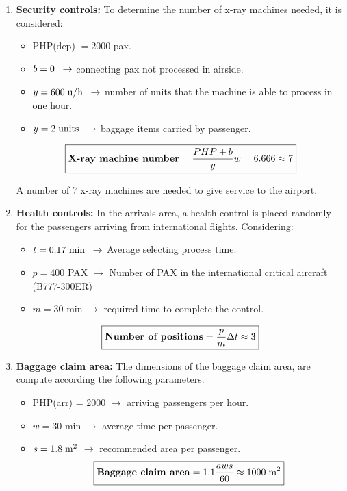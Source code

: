 \begin{enumerate}
\item \textbf{Security controls:} To determine the number of x-ray machines needed, it is considered:
\begin{itemize}
\item PHP(dep) $= 2000$ pax.
\item $b = 0 \hspace{2mm} \rightarrow$ connecting pax not processed in airside.
\item $y = 600\hspace{1mm} \text{u/h} \hspace{2mm} \rightarrow$ number of units that the machine is able to process in one hour.
\item $y = 2\hspace{1mm} \text{units} \hspace{2mm} \rightarrow$ baggage items carried by passenger.
\end{itemize}

\begin{align*}
\boxed{\text{\textbf{X-ray machine number}}= \dfrac{PHP+b}{y}w = 6.666 \approx 7}
\end{align*}

A number of 7 x-ray machines are needed to give service to the airport.

\item \textbf{Health controls:} In the arrivals area, a health control is placed randomly for the passengers arriving from international flights. Considering:
\begin{itemize}
\item $t = 0.17\text{ min} \hspace{2mm} \rightarrow $ Average selecting process time.
\item $p = 400$ PAX $\rightarrow$ Number of PAX in the international critical aircraft (B777-300ER)
\item $m = 30$ min $\rightarrow$ required time to complete the control.
\end{itemize}

\begin{align*}
\boxed{\text{\textbf{Number of positions}} = \dfrac{p}{m}\Delta t \approx 3   }
\end{align*}


\item \textbf{Baggage claim area:} The dimensions of the baggage claim area, are compute according the following parameters.
\begin{itemize}
\item PHP(arr) = 2000 $\rightarrow$ arriving passengers per hour.
\item $w = 30$ min $\rightarrow$ average time per passenger.
\item $s = 1.8\hspace{1mm} \mathrm{m^2}$ $\rightarrow$ recommended area per passenger.
\begin{align*}
\boxed{\text{\textbf{Baggage claim area}} = 1.1\dfrac{aws}{60} \approx 1000 \hspace{1mm}\mathrm{m^2} }
\end{align*}
\end{itemize}


\end{enumerate}
